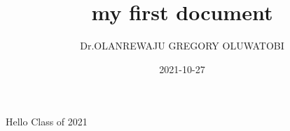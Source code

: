 \documentclass{article}
\title{my first document}
\date{2021-10-27}
\author{Dr.OLANREWAJU GREGORY OLUWATOBI}
\begin{document}
	\maketitle
	\newpage
	Hello Class of 2021
\end{document}
